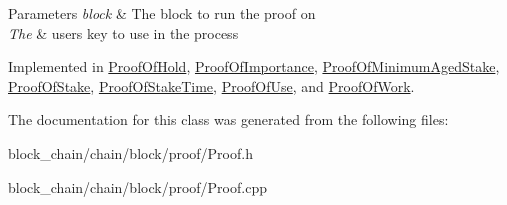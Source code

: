 \begin{DoxyParams}{Parameters}
{\em block} & The block to run the proof on \\
\hline
{\em The} & user\textquotesingle{}s key to use in the process \\
\hline
\end{DoxyParams}


Implemented in \mbox{\hyperlink{classProofOfHold_a56f59ff740518726db1667b39ae9451e}{Proof\+Of\+Hold}}, \mbox{\hyperlink{classProofOfImportance_afb53c930bf8afc5371ae91da04927415}{Proof\+Of\+Importance}}, \mbox{\hyperlink{classProofOfMinimumAgedStake_aa850369d6f8ebf7fa833821a43049147}{Proof\+Of\+Minimum\+Aged\+Stake}}, \mbox{\hyperlink{classProofOfStake_aed9baba95df4aba7e8bd0a3e70c44945}{Proof\+Of\+Stake}}, \mbox{\hyperlink{classProofOfStakeTime_ad4a49d7ccee740f307c03a13d314d3fb}{Proof\+Of\+Stake\+Time}}, \mbox{\hyperlink{classProofOfUse_a0673ae91f48264a85cb45e55d88e16b7}{Proof\+Of\+Use}}, and \mbox{\hyperlink{classProofOfWork_a80cbd012ee3f9e92a8497efac84bf689}{Proof\+Of\+Work}}.



The documentation for this class was generated from the following files\+:\begin{DoxyCompactItemize}
\item 
block\+\_\+chain/chain/block/proof/Proof.\+h\item 
block\+\_\+chain/chain/block/proof/Proof.\+cpp\end{DoxyCompactItemize}
